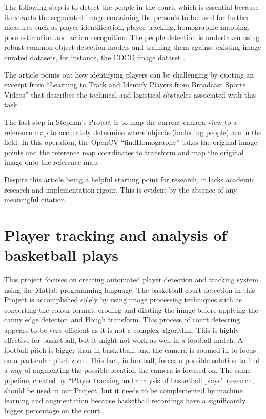 \documentclass[
    11pt,
    twoside
]{report}
\begin{document}
The following step is to detect the people in the court, which is essential because it extracts the segmented image containing the person's to be used for further measures such as player identification, player tracking, homographic mapping, pose estimation and action recognition. The people detection is undertaken using robust common object detection models and training them against existing image curated datasets, for instance, the COCO image dataset \cite{cocodataset}.


The article points out how identifying players can be challenging by quoting an excerpt from ``Learning to Track and Identify Players from Broadcast Sports Videos'' \cite{learn_track_id} that describes the technical and logistical obstacles associated with this task.


The last step in Stephan's Project is to map the current camera view to a reference map to accurately determine where objects (including people) are in the field. In this operation, the OpenCV \cite{opencv} ``findHomography'' takes the original image points and the reference map coordinates to transform and map the original image onto the reference map.


Despite this article being a helpful starting point for research, it lacks academic research and implementation rigour. This is evident by the absence of any meaningful citation.


\section{Player tracking and analysis of basketball plays}

This project \cite{baskettrack} focuses on creating automated player detection and tracking system using the Matlab programming language. The basketball court detection in this Project is accomplished solely by using image processing techniques such as converting the colour format, eroding and dilating the image before applying the canny edge detector, and Hough transform. This process of court detecting appears to be very efficient as it is not a complex algorithm. This is highly effective for basketball, but it might not work as well in a football match. A football pitch is bigger than in basketball, and the camera is zoomed in to focus on a particular pitch zone. This fact, in football, forces a possible solution to find a way of augmenting the possible location the camera is focused on. The same pipeline, created by ``Player tracking and analysis of basketball plays'' research, should be used in our Project, but it needs to be complemented by machine learning and augmentation because basketball recordings have a significantly bigger percentage on the court \cite{baskettrack}.
\end{document}
